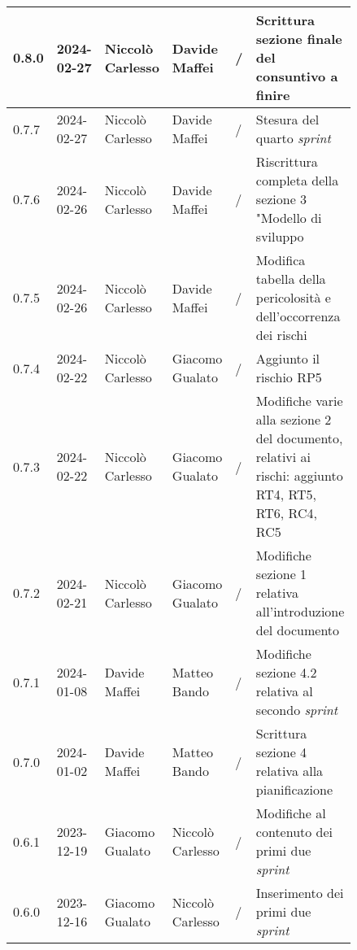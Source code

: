 {\begin{longtable}{p{0.10\linewidth}p{0.10\linewidth}p{0.15\linewidth}p{0.15\linewidth}p{0.10\linewidth}p{0.24\linewidth}}
	  \hline
	  0.8.0             & 2024-02-27    & Niccolò Carlesso       & Davide Maffei          & /                    & Scrittura sezione finale del consuntivo a finire                         \\
	  \hline
	  0.7.7             & 2024-02-27    & Niccolò Carlesso       & Davide Maffei          & /                    & Stesura del quarto \textit{sprint}                                       \\
	  \hline
	  0.7.6             & 2024-02-26    & Niccolò Carlesso       & Davide Maffei          & /                    & Riscrittura completa della sezione 3 "Modello di sviluppo                \\
	  \hline
	  0.7.5             & 2024-02-26    & Niccolò Carlesso       & Davide Maffei          & /                    & Modifica tabella della pericolosità e dell’occorrenza dei rischi         \\
	  \hline
	  0.7.4             & 2024-02-22    & Niccolò Carlesso       & Giacomo Gualato        & /                    & Aggiunto il rischio RP5                                                  \\
	  \hline
	  0.7.3             & 2024-02-22    & Niccolò Carlesso       & Giacomo Gualato        & /                    & Modifiche varie alla sezione 2 del documento, relativi ai rischi:
	  aggiunto RT4, RT5, RT6, RC4, RC5                                                                                                                                                      \\
	  \hline
	  0.7.2             & 2024-02-21    & Niccolò Carlesso       & Giacomo Gualato        & /                    & Modifiche sezione 1 relativa all'introduzione del documento              \\
	  \hline
	  0.7.1             & 2024-01-08    & Davide Maffei          & Matteo Bando           & /                    & Modifiche sezione 4.2 relativa al secondo \textit{sprint}                \\
	  \hline
	  0.7.0             & 2024-01-02    & Davide Maffei          & Matteo Bando           & /                    & Scrittura sezione 4 relativa alla pianificazione                         \\
	  \hline
	  0.6.1             & 2023-12-19    & Giacomo Gualato        & Niccolò Carlesso       & /                    & Modifiche al contenuto dei primi due \textit{sprint}                     \\
	  \hline
	  0.6.0             & 2023-12-16    & Giacomo Gualato        & Niccolò Carlesso       & /                    & Inserimento dei primi due \textit{sprint}                                \\

\end{longtable}}
